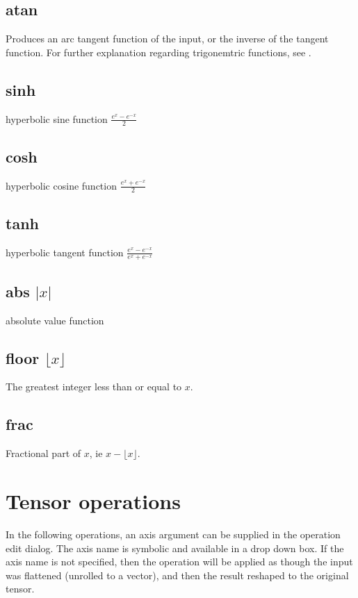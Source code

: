 \subsection{atan}\label{Operation:atan} Produces an arc tangent function of the input, 
or the inverse of the tangent function. For further explanation
regarding trigonemtric functions, see .

\subsection{sinh}\label{Operation:sinh} hyperbolic sine function
$\frac{e^x-e^{-x}}2$
\subsection{cosh}\label{Operation:cosh} hyperbolic cosine function
$\frac{e^x+e^{-x}}2$
\subsection{tanh}\label{Operation:tanh} hyperbolic tangent function
$\frac{e^x-e^{-x}}{e^x+e^{-x}}$
\subsection{abs $|x|$}\label{Operation:abs} absolute value function
\subsection{floor $\lfloor x\rfloor$}\label{Operation:floor} The
greatest integer less than or equal to $x$.
\subsection{frac}\label{Operation:frac} Fractional part of $x$, ie
$x-\lfloor x\rfloor$.

\section{Tensor operations}\label{tensor
  operations}

In the following operations, an axis argument can be supplied in the
operation edit dialog. The axis name is symbolic and available in a
drop down box. If the axis name is not specified, then the operation
will be applied as though the input was flattened (unrolled to a
vector), and then the result reshaped to the original tensor.

